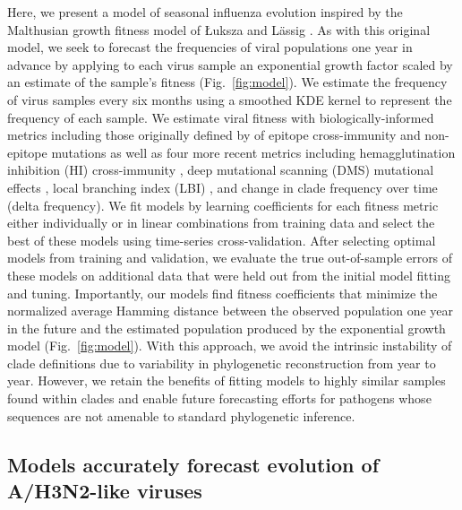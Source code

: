 Here, we present a model of seasonal influenza evolution inspired by the Malthusian growth fitness model of {\L}uksza and L\"assig \cite{Luksza:2014hj}.
As with this original model, we seek to forecast the frequencies of viral populations one year in advance by applying to each virus sample an exponential growth factor scaled by an estimate of the sample's fitness (Fig.~\ref{fig:model}).
We estimate the frequency of virus samples every six months using a smoothed KDE kernel to represent the frequency of each sample.
We estimate viral fitness with biologically-informed metrics including those originally defined by \cite{Luksza:2014hj} of epitope cross-immunity and non-epitope mutations as well as four more recent metrics including hemagglutination inhibition (HI) cross-immunity \cite{Neher:2016hy}, deep mutational scanning (DMS) mutational effects \cite{Lee2018}, local branching index (LBI) \cite{Neher:2014eu}, and change in clade frequency over time (delta frequency).
We fit models by learning coefficients for each fitness metric either individually or in linear combinations from training data and select the best of these models using time-series cross-validation.
After selecting optimal models from training and validation, we evaluate the true out-of-sample errors of these models on additional data that were held out from the initial model fitting and tuning.
Importantly, our models find fitness coefficients that minimize the normalized average Hamming distance between the observed population one year in the future and the estimated population produced by the exponential growth model (Fig.~\ref{fig:model}).
With this approach, we avoid the intrinsic instability of clade definitions due to variability in phylogenetic reconstruction from year to year.
However, we retain the benefits of fitting models to highly similar samples found within clades and enable future forecasting efforts for pathogens whose sequences are not amenable to standard phylogenetic inference.

\subsection*{Models accurately forecast evolution of A/H3N2-like viruses}

